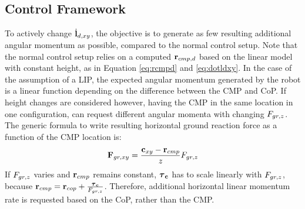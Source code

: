 \subsection{Control Framework}
To actively change $\dot{\mathbf{l}}_{d,xy}$, the objective is to generate as few resulting additional angular momentum as possible, compared to the normal control setup. Note that the normal control setup relies on a computed $\mathbf{r}_{cmp,d}$ based on the linear model with constant height, as in Equation \eqref{eq:rcmpd} and \eqref{eq:dotldxy}. In the case of the assumption of a \ac{LIP}, the expected angular momentum generated by the robot is a linear function depending on the difference between the \ac{CMP} and \ac{CoP}. If height changes are considered however, having the \ac{CMP} in the same location in one configuration, can request different angular momenta with changing $F_{gr,z}$. The generic formula to write resulting horizontal ground reaction force as a function of the \ac{CMP}  location is:
\begin{equation}
\mathbf{F}_{gr,xy}=\frac{\mathbf{c}_{xy}-\mathbf{r}_{cmp}}{z}F_{gr,z}
\label{eq:fgrxygeneric}
\end{equation}
If $F_{gr,z}$ varies and $\mathbf{r}_{cmp}$ remains constant, $\boldsymbol{\tau}_{\mathbf{c}}$ has to scale linearly with $F_{gr,z}$, because $\mathbf{r}_{cmp} = \mathbf{r}_{cop} + \frac{\boldsymbol{\tau}_{\mathbf{c}}}{F_{gr,z}}$. Therefore, additional horizontal linear momentum rate is requested based on the \ac{CoP}, rather than the \ac{CMP}.
